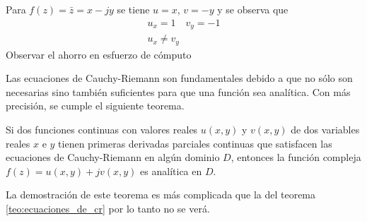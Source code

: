 \begin{example}
  Para $f(z)=\bar{z}=x-jy$ se tiene $u=x$, $v=-y$ y se observa que
  \begin{gather*}
    u_x=1 \quad v_y = -1 \\ 
    u_x \neq v_y
  \end{gather*}
  Observar el ahorro en esfuerzo de cómputo
\end{example}

Las ecuaciones de Cauchy-Riemann son fundamentales debido a que no sólo son necesarias sino también suficientes para que una función sea analítica. Con más precisión, se cumple el siguiente teorema.

\begin{theorem}
  Si dos funciones continuas con valores reales $u(x,y)$ y $v(x,y)$ de dos variables reales $x$ e $y$ tienen primeras derivadas parciales continuas que satisfacen las ecuaciones de Cauchy-Riemann en algún dominio $D$, entonces la función compleja $f(z)=u(x,y)+jv(x,y)$ es analítica en $D$.
\end{theorem}

La demostración de este teorema es más complicada que la del teorema \ref{teo:ecuaciones_de_cr} por lo tanto no se verá.

